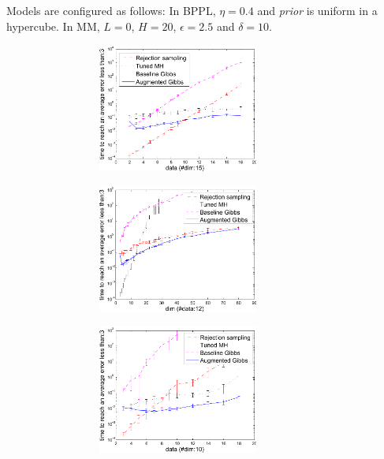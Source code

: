Models are configured as follows: In BPPL, $\eta = 0.4$ and \emph{prior} is uniform in a hypercube.
In MM, $L = 0$, $H=20$, $\epsilon = 2.5$ and $\delta=10$. 


\begin{figure} %
\centering
\vspace{-5mm}
\begin{subfigure}{.48\textwidth}
  \centering
  \includegraphics[width=0.8\textwidth,height=120pt]{plot/bppl_data_analysis_fit.pdf}
  \caption{}
  \label{fig:error-samples-bppl}
\end{subfigure}
\begin{subfigure}{.48\textwidth}
  \centering
  \hspace{5mm} 
  \includegraphics[width=0.8\textwidth,height=120pt]{plot/bppl_dim_analysis_fit.pdf}
  \caption{}
  \label{fig:error-samples-bppl}
\end{subfigure}
%
\centering
\begin{subfigure}{.48\textwidth}
  \centering
  \includegraphics[width=0.8\textwidth,height=120pt]{plot/mmm_data_analysis2.pdf}

\end{subfigure}
\end{figure}
